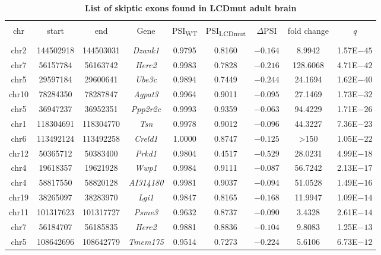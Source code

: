 \begin{table}[!htbp] \centering 
	\caption[List of skiptic exons found in LCDmut adult brain]{
		\textbf{List of skiptic exons found in LCDmut adult brain}
	} 
	\label{append:skiptics} 
	\footnotesize
\begin{tabular}{@{\extracolsep{5pt}} ccccccccc} 
	
	\\[-1.8ex]\hline 
	\hline \\[-1.8ex] 
	chr & start & end & Gene & PSI\textsubscript{WT} & PSI\textsubscript{LCDmut} & $\Delta$PSI & fold change & \textit{q} \\ 
	\hline \\[-1.8ex] 
	chr2 & 144502918 &144503031 & \textit{Dzank1} & 0.9795 & 0.8160 & $-0.164$ & 8.9942 & 1.57E$-45$ \\ 
	chr7 & 56157784 & 56163742 & \textit{Herc2} & 0.9983 & 0.7828 & $-0.216$ & 128.6068 & 4.71E$-42$\\ 
	chr5 & 29597184 & 29600641 & \textit{Ube3c} & 0.9894 & 0.7449 & $-0.244$ & 24.1694 & 1.62E$-40$\\ 
	chr10 & 78284350 & 78287847 & \textit{Agpat3} & 0.9964 & 0.9011 & $-0.095$ & 27.1469 & 1.73E$-32$ \\ 
	chr5 & 36947237 & 36952351 & \textit{Ppp2r2c} & 0.9993 & 0.9359 & $-0.063$ & 94.4229 & 1.71E$-26$\\ 
	chr1 & 118304691  &118304770& \textit{Tsn} & 0.9978 & 0.9012 & $-0.096$ & 44.3227 & 7.36E$-23$ \\ 
	chr6 & 113492124  & 113492258 & \textit{Creld1} & 1.0000 & 0.8747 & $-0.125$ & \textgreater 150 & 1.05E$-22$ \\ 
	chr12 & 50365712 & 50383400 & \textit{Prkd1} & 0.9804 & 0.4517 & $-0.529$ & 28.0231 & 4.99E$-18$\\ 
	chr4 & 19618357 & 19621928 & \textit{Wwp1} & 0.9984 & 0.9111 & $-0.087$ & 56.7242 & 2.13E$-17$ \\ 
	chr4 & 58817550 & 58820128 & \textit{AI314180} & 0.9981 & 0.9037 & $-0.094$ & 51.0528 & 1.49E$-16$\\ 
	chr19 & 38265097 & 38283970 & \textit{Lgi1} & 0.9847 & 0.8165 & $-0.168$ & 11.9947 & 1.09E$-14$\\ 
	chr11 & 101317623  &101317727 & \textit{Psme3} & 0.9632 & 0.8737 & $-0.090$ & 3.4328 & 2.61E$-14$\\ 
	chr7 & 56184707 & 56185835 & \textit{Herc2} & 0.9881 & 0.8836 & $-0.104$ & 9.8083 & 1.25E$-13$\\ 
	chr5 & 108642696  & 108642779& \textit{Tmem175} & 0.9514 & 0.7273 & $-0.224$ & 5.6106 & 6.73E$-12$\\ 

\end{tabular}
\end{table}
